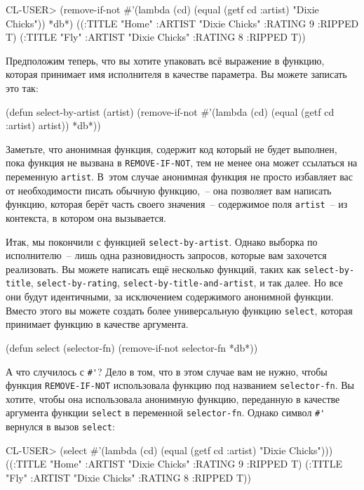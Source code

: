 \begin{myverb}
CL-USER> (remove-if-not
  #'(lambda (cd) (equal (getf cd :artist) "Dixie Chicks")) *db*)
((:TITLE "Home" :ARTIST "Dixie Chicks" :RATING 9 :RIPPED T)
 (:TITLE "Fly" :ARTIST "Dixie Chicks" :RATING 8 :RIPPED T))
\end{myverb}

Предположим теперь, что вы хотите упаковать всё выражение в функцию, которая принимает имя
исполнителя в качестве параметра. Вы можете записать это так:

\begin{myverb}
(defun select-by-artist (artist)
  (remove-if-not
   #'(lambda (cd) (equal (getf cd :artist) artist))
   *db*))
\end{myverb}

Заметьте, что анонимная функция, содержит код который не будет выполнен, пока функция не
вызвана в \lstinline{REMOVE-IF-NOT}, тем не менее она может ссылаться на переменную
\lstinline{artist}. В~этом случае анонимная функция не просто избавляет вас от необходимости
писать обычную функцию,~-- она позволяет вам написать функцию, которая берёт часть своего
значения~-- содержимое поля \lstinline{artist}~-- из контекста, в котором она вызывается.

Итак, мы покончили с функцией \lstinline{select-by-artist}. Однако выборка по исполнителю~--
лишь одна разновидность запросов, которые вам захочется реализовать. Вы можете написать
ещё несколько функций, таких как \lstinline{select-by-title}, \lstinline{select-by-rating},
\lstinline{select-by-title-and-artist}, и так далее. Но все они будут идентичными, за
исключением содержимого анонимной функции. Вместо этого вы можете создать более
универсальную функцию \lstinline{select}, которая принимает функцию в качестве аргумента.

\begin{myverb}
(defun select (selector-fn)
  (remove-if-not selector-fn *db*))
\end{myverb}

А что случилось с \lstinline!#'!? Дело в том, что в этом случае вам не нужно, чтобы функция
\lstinline{REMOVE-IF-NOT} использовала функцию под названием \lstinline{selector-fn}. Вы хотите,
чтобы она использовала анонимную функцию, переданную в качестве аргумента функции
\lstinline{select} в переменной \lstinline{selector-fn}. Однако символ \lstinline!#'! вернулся в вызов
\lstinline{select}:

\begin{myverb}
CL-USER> (select #'(lambda (cd) (equal (getf cd :artist) "Dixie Chicks")))
((:TITLE "Home" :ARTIST "Dixie Chicks" :RATING 9 :RIPPED T)
 (:TITLE "Fly" :ARTIST "Dixie Chicks" :RATING 8 :RIPPED T))
\end{myverb}


